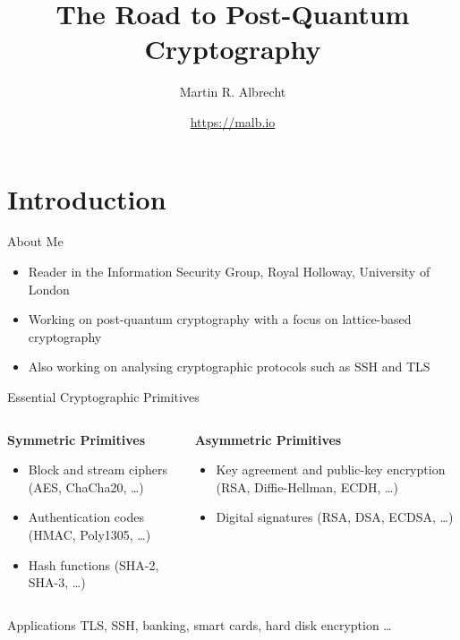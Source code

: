 \documentclass[xcolor=table,10pt,aspectratio=169]{beamer}
\author{Martin R. Albrecht}
\date{\url{https://malb.io}}
\title{The Road to Post-Quantum Cryptography}
\begin{document}
\maketitle

\section{Introduction}
\label{sec:org6f452e0}

\begin{frame}[label={sec:org06ce844}]{About Me}
\begin{itemize}
\item Reader in the Information Security Group, Royal Holloway, University of London
\item Working on post-quantum cryptography with a focus on lattice-based cryptography 
\item Also working on analysing cryptographic protocols such as SSH  and TLS  
\end{itemize}
\end{frame}

\begin{frame}[label={sec:orge01e1d4}]{Essential Cryptographic Primitives}
\begin{columns}[t]
\begin{column}{0.5\columnwidth}
\textbf{Symmetric Primitives}

\small

\begin{itemize}
\item Block and stream ciphers (AES, ChaCha20, \ldots)
\item Authentication codes (HMAC, Poly1305, \ldots)
\item Hash functions (SHA-2, SHA-3, \ldots)
\end{itemize}
\end{column}

\begin{column}{0.5\columnwidth}
\textbf{Asymmetric Primitives}

\small

\begin{itemize}
\item Key agreement and public-key encryption (RSA, Diffie-Hellman, ECDH, \ldots)
\item Digital signatures (RSA, DSA, ECDSA, \ldots)
\end{itemize}
\end{column}
\end{columns}

\begin{block}{Applications}
TLS, SSH, banking, smart cards, hard disk encryption …
\end{block}

\vspace{7.2em}
\end{frame}
\end{document}
